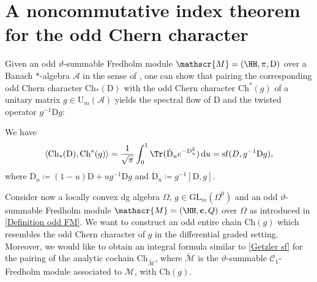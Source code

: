 \documentclass[a4paper, english, 12pt, bibliography=totocnumbered,
index=totoc]{scrartcl}
\begin{document}
\section{A noncommutative index theorem for the odd Chern character}
Given an odd $\vartheta$-summable Fredholm module $\mathscr{M} = (\HH, \pi,
\mathrm{D})$ over a Banach $*$-algebra $\mathcal{A}$ in the sense of
\cite{ConnesCompact}, one can show that pairing the corresponding odd Chern
character $\mathrm{Ch}_*(\mathrm{D})$ with the odd Chern character
$\mathrm{Ch}^{*}(g)$ of a unitary matrix $g \in \mathrm{U}_m(\mathcal{A})$
yields the spectral flow of $\mathrm{D}$ and the twisted operator
$g^{-1}\mathrm{D}g$:
\begin{thm}\label{Getzler sf}
	We have
	\begin{equation}\label{Spectral flow pairing}
		\langle \mathrm{Ch}_*(\mathrm{D}), \mathrm{Ch}^{*}(g) \rangle =
		\frac{1}{\sqrt{\pi}} \int_0^1 \Tr(\dot{\mathrm{D}}_u
		e^{-\mathrm{D}_u^2}) \, \mathrm{d}u = \mathrm{sf}(D,
		g^{-1}\mathrm{D}g),
	\end{equation}
	where $\mathrm{D}_u \coloneqq (1-u)\mathrm{D} + ug^{-1}\mathrm{D}g$ and
	$\dot{\mathrm{D}}_u \coloneqq g^{-1} [\mathrm{D}, g]$.
\end{thm}
Consider now a locally convex dg algebra $\Omega$, $g \in
\mathrm{GL}_m(\Omega^0)$ and an odd $\vartheta$-summable Fredholm
module $\mathscr{M} = (\HH, \mathbf{c}, Q)$ over $\Omega$ as introduced in
\cref{Definition odd FM}.
We want to construct an odd entire chain $\mathrm{Ch}(g)$ which resembles
the odd Chern character of $g$ in the differential graded setting.
Moreover, we would like to obtain an integral formula similar to
\cref{Getzler sf} for the pairing of the analytic cochain
$\mathrm{Ch}_{\tilde{\mathscr{M}}}$,
where $\tilde{\mathscr{M}}$ is the $\vartheta$-summable
$\mathcal{C}_1$-Fredholm module associated to $\mathscr{M}$, with
$\mathrm{Ch}(g)$.
\end{document}
